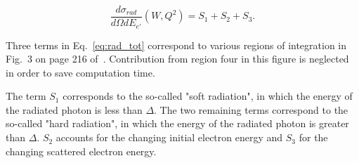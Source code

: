 \begin{equation}
\frac{d\sigma_{rad}}{d\Omega  dE_{e'}}(W,Q^{2}) = S_{1} + S_{2} + S_{3}.
\label{eq:rad_tot}
\end{equation}

Three terms in Eq.~\eqref{eq:rad_tot} correspond to various regions of integration in Fig.~3 on page 216 of~\cite{Mo:1968cg}. Contribution from region four in this figure is neglected in order to save computation time.

The term $S_{1}$ corresponds to the so-called "soft radiation", in which the energy of the radiated photon is less than $\Delta$. The two remaining terms correspond to the so-called "hard radiation", in which the energy of the radiated photon is greater than $\Delta$. $S_{2}$ accounts for the changing initial electron energy and $S_{3}$ for the changing scattered electron energy.

